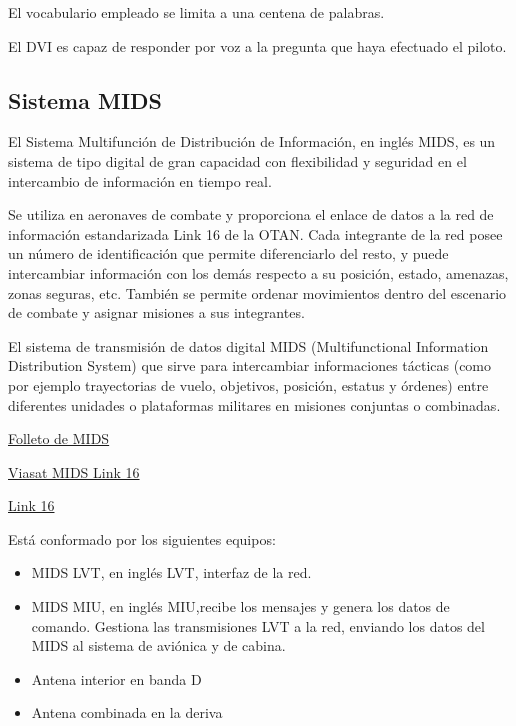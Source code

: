 El vocabulario empleado se limita a una centena de palabras.

El DVI es capaz de responder por voz a la pregunta que haya efectuado el piloto.

\subsection{Sistema MIDS}
\label{sec:09.03.03.MIDS}

El Sistema Multifunci\'on de Distribuci\'on de Informaci\'on, en ingl\'es \ac{MIDS}, es un sistema de tipo digital de gran capacidad con flexibilidad y seguridad en el intercambio de informaci\'on en tiempo real.

Se utiliza en aeronaves de combate y proporciona el enlace de datos a la red de información estandarizada Link 16 de la OTAN. Cada integrante de la red posee un n\'umero de identificaci\'on que permite diferenciarlo del resto, y puede intercambiar informaci\'on con los dem\'as respecto a su posici\'on, estado, amenazas, zonas seguras, etc. Tambi\'en se permite ordenar movimientos dentro del escenario de combate y asignar misiones a sus integrantes.

El sistema de transmisión de datos digital MIDS (Multifunctional Information Distribution System)  que sirve para intercambiar informaciones tácticas (como por ejemplo trayectorias de vuelo, objetivos, posición, estatus y órdenes) entre diferentes unidades o plataformas militares en misiones conjuntas o combinadas.

\href{http://tda-armements.com/sites/default/files/asset/document/13-mids_lvt_euromids_2010_bis_0.pdf}{Folleto de MIDS}

\href{https://www.viasat.com/products/link-16-mids-lvt1}{Viasat MIDS Link 16 }

\href{https://en.wikipedia.org/wiki/Link_16}{Link 16}

Est\'a conformado por los siguientes equipos:

\begin{itemize}
     \item MIDS LVT, en ingl\'es \ac{LVT}, interfaz de la red.
     \item MIDS MIU, en ingl\'es \ac{MIU},recibe los mensajes y genera los datos de comando. Gestiona las transmisiones LVT a la red, enviando los datos del MIDS al sistema de avi\'onica y de cabina.
     \item Antena interior en banda D
     \item Antena combinada en la deriva
\end{itemize}

